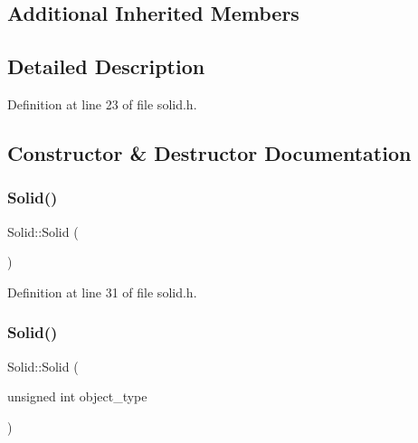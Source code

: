 \subsection*{Additional Inherited Members}


\subsection{Detailed Description}


Definition at line 23 of file solid.\+h.



\subsection{Constructor \& Destructor Documentation}
\mbox{\label{class_solid_a2cf157c87df66dc3eb8722f9b3ee8f66}} 
\subsubsection{\texorpdfstring{Solid()}{Solid()}\hspace{0.1cm}{\footnotesize\ttfamily [1/4]}}
{\footnotesize\ttfamily Solid\+::\+Solid (\begin{DoxyParamCaption}{ }\end{DoxyParamCaption})\hspace{0.3cm}{\ttfamily [inline]}}



Definition at line 31 of file solid.\+h.

\mbox{\label{class_solid_a00a71dfc929ca50ee9850bdfca5b3fd6}} 
\subsubsection{\texorpdfstring{Solid()}{Solid()}\hspace{0.1cm}{\footnotesize\ttfamily [2/4]}}
{\footnotesize\ttfamily Solid\+::\+Solid (\begin{DoxyParamCaption}\item[{unsigned int}]{object\+\_\+type }\end{DoxyParamCaption})\hspace{0.3cm}{\ttfamily [inline]}}



